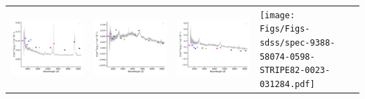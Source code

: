 \begin{center}
\begin{longtable}{l l l l l }
    \includegraphics[width=0.19\linewidth, clip]{Figs/Figs-sdss/spec-9238-58013-0137-SPLUS-s02s09-056401.pdf} & \includegraphics[width=0.19\linewidth, clip]{Figs/Figs-sdss/spec-9239-58018-0729-STRIPE82-0136-042690.pdf} & \includegraphics[width=0.19\linewidth, clip]{Figs/Figs-sdss/spec-9383-58097-0530-STRIPE82-0047-031879.pdf} & \texttt{[image: Figs/Figs-sdss/spec-9388-58074-0598-STRIPE82-0023-031284.pdf]} \\
  \end{longtable}
\end{center}
